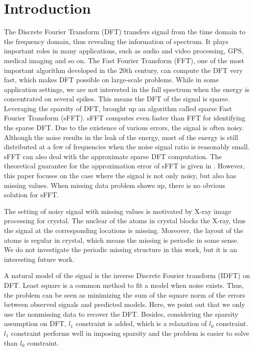\documentclass[final,onefignum,onetabnum]{siamart190516}
\begin{document}
\section{Introduction}
The Discrete Fourier Transform (DFT) transfers signal from the time domain to the frequency domain, thus revealing the information of spectrum. It plays important roles in many applications, such as audio and video processing, GPS, medical imaging and so on. The Fast Fourier Transform (FFT), one of the most important algorithm developed in the 20th century, can compute the DFT very fast, which makes DFT possible on large-scale problems. While in some application settings, we are not interested in the full spectrum when the energy is concentrated on several spikes. This means the DFT of the signal is sparse. Leveraging the sparsity of DFT, \cite{hassanieh2012simple} brought up an algorithm called sparse Fast Fourier Transform (sFFT). sFFT computes even faster than FFT for identifying the sparse DFT. Due to the existence of various errors, the signal is often noisy. Although the noise results in the leak of the energy, most of the energy is still distributed at a few of frequencies when the noise signal ratio is reasonably small. sFFT can also deal with the approximate sparse DFT computation. The theoretical guarantee for the approximation error of sFFT is given in \cite{hassanieh2012nearly}. However, this paper focuses on the case where the signal is not only noisy, but also has missing values. When missing data problem shows up, there is no obvious solution for sFFT. 

The setting of noisy signal with missing values is motivated by X-ray image processing for crystal. The nuclear of the atoms in crystal blocks the X-ray, thus the signal at the corresponding locations is missing. Moreover, the layout of the atoms is regular in crystal, which means the missing is periodic in some sense. We do not investigate the periodic missing structure in this work, but it is an interesting future work.

A natural model of the signal is the inverse Discrete Fourier transform (IDFT) on DFT. Least square is a common method to fit a model when noise exists. Thus, the problem can be seen as minimizing the sum of the square norm of the errors between observed signals and predicted models. Here, we point out that we only use the nonmissing data to recover the DFT. Besides, considering the sparsity assumption on DFT, $l_1$ constraint is added, which is a relaxation of $l_0$ constraint. $l_1$ constraint performs well in imposing sparsity and the problem is easier to solve than $l_0$ constraint.
\end{document}
